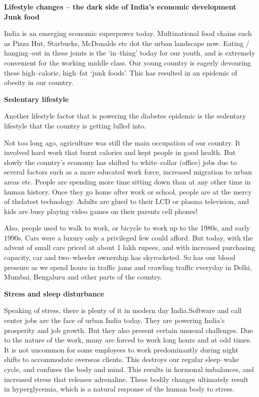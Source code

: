 \noindent\textbf{Lifestyle changes – the dark side of India’s economic development Junk food}

India is an emerging economic superpower today. Multinational food chains such as Pizza Hut, Starbucks, McDonalds etc dot the urban landscape now. Eating / hanging–out in these joints is the ‘in–thing’ today for our youth, and is extremely convenient for the working mi\-ddle class. Our young country is eagerly devouring these high–calorie, high–fat ‘junk foods’. This has resulted in an epidemic of obesity in our country.

\noindent\textbf{Sedentary lifestyle}

Another lifestyle factor that is powering the diabetes epidemic is the sedentary lifestyle that the country is getting lulled into.

Not too long ago, agriculture was still the main occupation of our country. It involved hard work that burnt calories and kept people in good health. But slowly the country’s economy has shifted to white–collar (office) jobs due to several factors such as a more educated work force, increased migration to urban areas etc. People are spending more time sitting down than at any other time in human history. Once they go home after work or school, people are at the mercy of the\break latest technology. Adults are glued to their LCD or plasma television, and kids are busy playing video games on their parents cell phones!

Also, people used to walk to work, or bicycle to work up to the 1980s, and early 1990s. Cars were a luxury only a privileged few could afford. But today, with the advent of small cars priced at about 1 lakh rupees, and with increased purchasing capacity, car and two–wheeler ownership has skyrocketed. So has our blood pressure as we spend hours in traffic jams and crawling traffic everyday in Delhi, Mumbai, Bengaluru and other parts of the country.
 
 \clearpage
\noindent\textbf{Stress and sleep disturbance}

\vskip 8pt
Speaking of stress, there is plenty of it in modern day India.\break Software and call center jobs are the face of urban India today. They are powering India’s prosperity and job growth. But they also present certain unusual challenges. Due to the nature of the work, many are forced to work long hours and at odd times. It is not uncommon for some employees to work predominantly during night shifts to acco\-mmodate overseas clients. This destroys our regular sleep–wake cycle, and confuses the body and mind. This results in hormonal imbalances, and increased stress that releases adrenaline. These bodily changes ultimately result in hyperglycemia, which is a natural response of the human body to stress.


